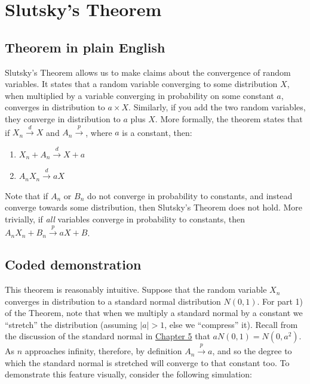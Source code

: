 \documentclass[
]{book}
\providecommand{\tightlist}{%
  \setlength{\itemsep}{0pt}\setlength{\parskip}{0pt}}
\begin{document}
\hypertarget{slutsky}{%
\chapter{Slutsky's Theorem}\label{slutsky}}

\hypertarget{theorem_slutsky}{%
\section{Theorem in plain English}\label{theorem_slutsky}}

Slutsky's Theorem allows us to make claims about the convergence of random variables. It states that a random variable converging to some distribution \(X\), when multiplied by a variable converging in probability on some constant \(a\), converges in distribution to \(a \times X\). Similarly, if you add the two random variables, they converge in distribution to \(a\) plus \(X\). More formally, the theorem states that if \(X_n \xrightarrow{d} X\) and \(A_n \xrightarrow{p}\), where \(a\) is a constant, then:

\begin{enumerate}
\def\labelenumi{\arabic{enumi}.}
\tightlist
\item
  \(X_n + A_n \xrightarrow{d} X + a\)
\item
  \(A_nX_n \xrightarrow{d} aX\)
\end{enumerate}

Note that if \(A_n\) or \(B_n\) do not converge in probability to constants, and instead converge towards some distribution, then Slutsky's Theorem does not hold. More trivially, if \emph{all} variables converge in probability to constants, then \(A_nX_n + B_n \xrightarrow{p} aX+B\).

\hypertarget{coded-demonstration}{%
\section{Coded demonstration}\label{coded-demonstration}}

This theorem is reasonably intuitive. Suppose that the random variable \(X_n\) converges in distribution to a standard normal distribution \(N(0,1)\). For part 1) of the Theorem, note that when we multiply a standard normal by a constant we ``stretch'' the distribution (assuming \(|a|>1\), else we ``compress'' it). Recall from the discussion of the standard normal in \protect\hyperlink{wlln}{Chapter 5} that \(aN(0,1) = N(0,a^2)\). As \(n\) approaches infinity, therefore, by definition \(A_n \xrightarrow{p} a\), and so the degree to which the standard normal is stretched will converge to that constant too. To demonstrate this feature visually, consider the following simulation:
\end{document}

